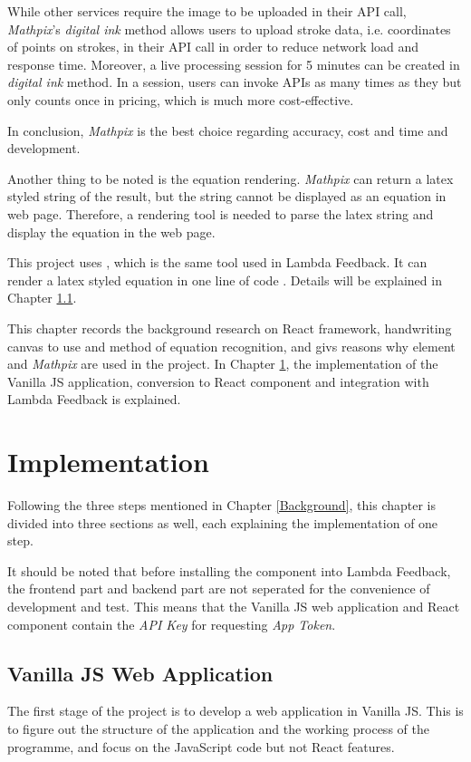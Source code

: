 \documentclass[12pt,twoside]{report}
\begin{document}
While other services require the image to be uploaded in their API call,
\textit{Mathpix}'s \textit{digital ink} method allows users to upload stroke
data, i.e. coordinates of points on strokes, in their API call in order to
reduce network load and response time. Moreover, a live processing session for 5
minutes can be created in \textit{digital ink} method. In a session, users can
invoke APIs as many times as they but only counts once in pricing, which is much
more cost-effective.

In conclusion, \textit{Mathpix} is the best choice regarding accuracy, cost and time and development.

Another thing to be noted is the equation rendering. \textit{Mathpix} can return a latex styled string of the result, but the string cannot be displayed as an equation in web page. Therefore, a rendering tool is needed to parse the latex string and display the equation in the web page. 

This project uses , which is the same tool used in Lambda Feedback. It can render a latex styled equation in one line of code \cite{web:katexapi}. Details will be explained in Chapter \ref{vanillajs-implement}.

This chapter records the background research on React framework, handwriting canvas to use and method of equation recognition, and givs reasons why  element and \textit{Mathpix} are used in the project. In Chapter \ref{Implementation}, the implementation of the Vanilla JS application, conversion to React component and integration with Lambda Feedback is explained.



\chapter{Implementation}
\label{Implementation}

Following the three steps mentioned in Chapter \ref{Background}, this chapter is divided into three sections as well, each explaining the implementation of one step.

It should be noted that before installing the component into Lambda Feedback, the frontend part and backend part are not seperated for the convenience of development and test. This means that the Vanilla JS web application and React component contain the \textit{API Key} for requesting \textit{App Token}.

\section{Vanilla JS Web Application}
\label{vanillajs-implement}
The first stage of the project is to develop a web application in Vanilla JS. This is to figure out the structure of the application and the working process of the programme, and focus on the JavaScript code but not React features.
\end{document}
